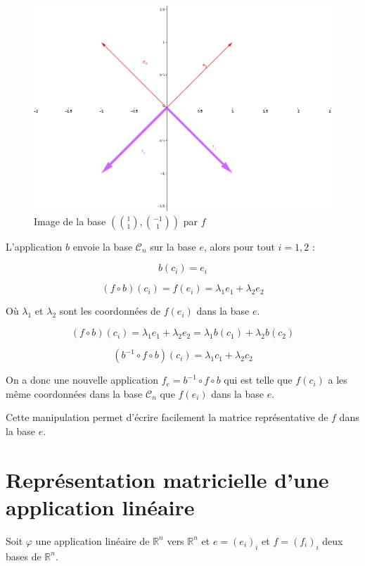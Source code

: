 \documentclass[]{article}
\theoremstyle{remark}
\theoremstyle{definition}
\begin{document}
		\newpage
		
		\begin{figure}[h!]
			\centering
			\includegraphics[width=350pt]{Img2.png}
			\caption{Image de la base $\left(\binom{1}{1},\binom{-1}{1}\right)$ par $f$}
		\end{figure}
		
		L'application $b$ envoie la base $\mathcal{C}_n$ sur la base $e$, alors pour tout $i=1, 2$ :
		
		$$b(c_i)=e_i$$
		
		$$(f \circ b)(c_i) = f(e_i) = \lambda_1 e_1 + \lambda_2 e_2$$
		
		Où $\lambda_1$ et $\lambda_2$ sont les coordonnées de $f(e_i)$ dans la base $e$.
		
		$$(f \circ b)(c_i) = \lambda_1 e_1 + \lambda_2 e_2 = \lambda_1 b (c_1) + \lambda_2 b (c_2)$$
		
		$$(b^{-1} \circ f \circ b)(c_i) = \lambda_1 c_1 + \lambda_2 c_2$$
		
		On a donc une nouvelle application $f_e = b^{-1} \circ f \circ b$ qui est telle que $f(c_i)$ a les même coordonnées dans la base $\mathcal{C}_n$ que $f(e_i)$ dans la base $e$.

		Cette manipulation permet d'écrire facilement la matrice représentative de $f$ dans la base $e$.

\section{Représentation matricielle d'une application linéaire}

	Soit $\varphi$ une application linéaire de $\mathbb{R}^n$ vers $\mathbb{R}^n$ et $e=(e_i)_i$ et $f=(f_i)_i$ deux bases de $\mathbb{R}^n$.
	
\end{document}
